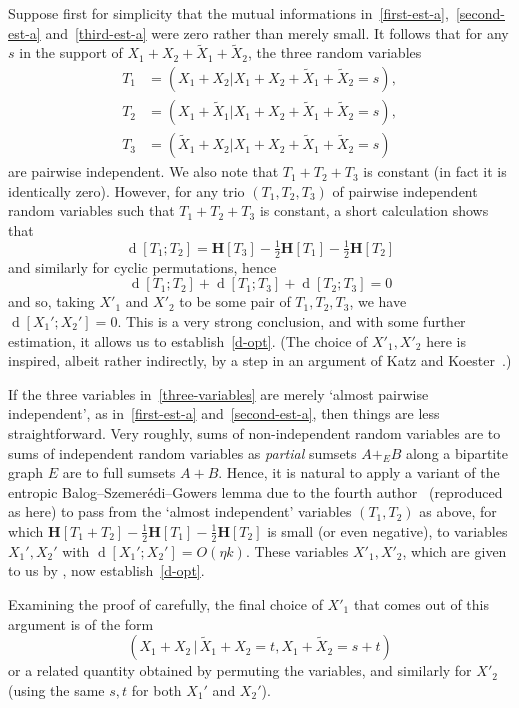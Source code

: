 \documentclass[12pt,reqno,tbtags]{amsart}
\theoremstyle{definition}
\theoremstyle{remark}
\newcommand{\ent}[1]{\mathbf{H}[#1]}
\newcommand{\dist}[2]{{\operatorname{d}[#1;#2]}} %
\numberwithin{equation}{section}
\begin{document}
Suppose first for simplicity that the mutual informations in~\eqref{first-est-a},\ \eqref{second-est-a} and~\eqref{third-est-a} were zero rather than merely small.
It follows that for any $s$ in the support of $X_1+X_2+ \tilde X_1+\tilde X_2$, the three random variables
\begin{align}
  \nonumber
  T_1&= (X_1+X_2 |X_1+X_2+\tilde X_1+\tilde X_2=s),\\
  \nonumber
  T_2&=(X_1+\tilde X_1 |X_1+X_2+\tilde X_1+\tilde X_2=s), \\
  T_3&=(\tilde X_1+X_2 |X_1+X_2+\tilde X_1+\tilde X_2=s)
  \label{three-variables}
\end{align}
are pairwise independent.
We also note that $T_1+T_2+T_3$ is constant (in fact it is identically zero).
However, for any trio $(T_1,T_2,T_3)$ of pairwise independent random variables such that $T_1+T_2+T_3$ is constant, a short calculation shows that
\[\dist{T_1}{T_2}  = \ent{T_3} - \tfrac{1}{2} \ent{T_1} - \tfrac{1}{2} \ent{T_2} \]
and similarly for cyclic permutations, hence
\begin{equation}
  \label{eq:i-eq-0}
  \dist{T_1}{T_2} + \dist{T_1}{T_3} + \dist{T_2}{T_3} = 0
\end{equation}
and so, taking $X'_1$ and $X'_2$ to be some pair of $T_1,T_2,T_3$, we have $\dist{X_1'}{X_2'} = 0$.
This is a very strong conclusion, and with some further estimation, it allows us to establish~\eqref{d-opt}. (The choice of $X'_1,X'_2$ here is inspired, albeit rather indirectly, by a step in an argument of Katz and Koester~\cite{kk}.)

If the three variables in~\eqref{three-variables} are merely `almost pairwise independent', as in~\eqref{first-est-a} and~\eqref{second-est-a}, then things are less straightforward.
Very roughly, sums of non-independent random variables are to sums of independent random variables as \emph{partial} sumsets $A+_E B$ along a bipartite graph $E$ are to full sumsets $A+B$.
Hence, it is natural to apply a variant of the entropic Balog--Szemer\'edi--Gowers lemma due to the fourth author~\cite[Lemma 3.3]{tao-entropy} (reproduced as  here) to pass from the `almost independent' variables $(T_1,T_2)$ as above, for which $\ent{T_1+T_2}-\tfrac12 \ent{T_1} - \tfrac12 \ent{T_2}$ is small (or even negative), to variables $X_1',X_2'$ with $\dist{X_1'}{X_2'} = O(\eta k)$.
These variables $X'_1,X'_2$, which are given to us by , now establish~\eqref{d-opt}.

Examining the proof of  carefully, the final choice of $X'_1$ that comes out of this argument is of the form
\begin{equation}
  \label{from-bsg}
  (X_1 + X_2 \,|\, \tilde X_1+ X_2 = t, X_1 + \tilde X_2 = s+t)
\end{equation}
or a related quantity obtained by permuting the variables, and similarly for $X'_2$ (using the same $s,t$ for both $X_1'$ and $X_2'$).
\end{document}
